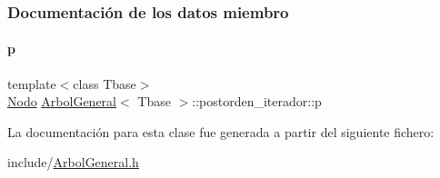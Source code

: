 \subsubsection{Documentación de los datos miembro}
\hypertarget{classArbolGeneral_1_1postorden__iterador_ae269432023776674c7633eadeb8c30e0}{}\label{classArbolGeneral_1_1postorden__iterador_ae269432023776674c7633eadeb8c30e0} 
\paragraph{\texorpdfstring{p}{p}}
{\footnotesize\ttfamily template$<$class Tbase$>$ \\
\hyperlink{classArbolGeneral_a12cc1b74a9095d89bc7334290d332f7a}{Nodo} \hyperlink{classArbolGeneral}{Arbol\+General}$<$ Tbase $>$\+::postorden\+\_\+iterador\+::p\hspace{0.3cm}{\ttfamily [private]}}



La documentación para esta clase fue generada a partir del siguiente fichero\+:\begin{DoxyCompactItemize}
\item 
include/\hyperlink{ArbolGeneral_8h}{Arbol\+General.\+h}\end{DoxyCompactItemize}

